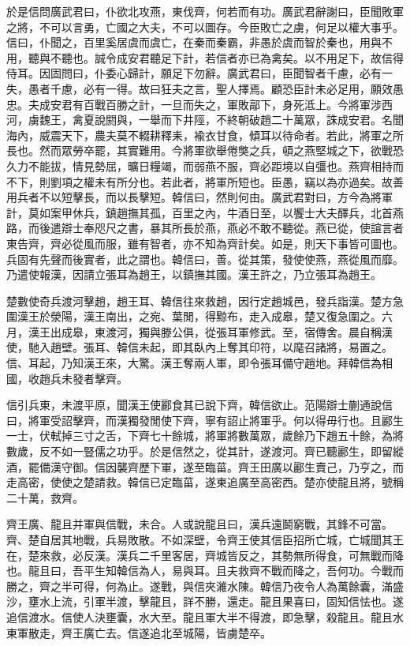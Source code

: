 於是信問廣武君曰，仆欲北攻燕，東伐齊，何若而有功。廣武君辭謝曰，臣聞敗軍之將，不可以言勇，亡國之大夫，不可以圖存。今臣敗亡之虜，何足以權大事乎。信曰，仆聞之，百里奚居虞而虞亡，在秦而秦霸，非愚於虞而智於秦也，用與不用，聽與不聽也。誠令成安君聽足下計，若信者亦已為禽矣。以不用足下，故信得侍耳。因固問曰，仆委心歸計，願足下勿辭。廣武君曰，臣聞智者千慮，必有一失，愚者千慮，必有一得。故曰狂夫之言，聖人擇焉。顧恐臣計未必足用，願效愚忠。夫成安君有百戰百勝之計，一旦而失之，軍敗鄗下，身死泜上。今將軍涉西河，虜魏王，禽夏說閼與，一舉而下井陘，不終朝破趙二十萬眾，誅成安君。名聞海內，威震天下，農夫莫不輟耕釋耒，褕衣甘食，傾耳以待命者。若此，將軍之所長也。然而眾勞卒罷，其實難用。今將軍欲舉倦獘之兵，頓之燕堅城之下，欲戰恐久力不能拔，情見勢屈，曠日糧竭，而弱燕不服，齊必距境以自彊也。燕齊相持而不下，則劉項之權未有所分也。若此者，將軍所短也。臣愚，竊以為亦過矣。故善用兵者不以短擊長，而以長擊短。韓信曰，然則何由。廣武君對曰，方今為將軍計，莫如案甲休兵，鎮趙撫其孤，百里之內，牛酒日至，以饗士大夫醳兵，北首燕路，而後遣辯士奉咫尺之書，暴其所長於燕，燕必不敢不聽從。燕已從，使諠言者東告齊，齊必從風而服，雖有智者，亦不知為齊計矣。如是，則天下事皆可圖也。兵固有先聲而後實者，此之謂也。韓信曰，善。從其策，發使使燕，燕從風而靡。乃遣使報漢，因請立張耳為趙王，以鎮撫其國。漢王許之，乃立張耳為趙王。

楚數使奇兵渡河擊趙，趙王耳、韓信往來救趙，因行定趙城邑，發兵詣漢。楚方急圍漢王於滎陽，漢王南出，之宛、葉閒，得黥布，走入成皋，楚又復急圍之。六月，漢王出成皋，東渡河，獨與滕公俱，從張耳軍修武。至，宿傳舍。晨自稱漢使，馳入趙壁。張耳、韓信未起，即其臥內上奪其印符，以麾召諸將，易置之。信、耳起，乃知漢王來，大驚。漢王奪兩人軍，即令張耳備守趙地。拜韓信為相國，收趙兵未發者擊齊。

信引兵東，未渡平原，聞漢王使酈食其已說下齊，韓信欲止。范陽辯士蒯通說信曰，將軍受詔擊齊，而漢獨發閒使下齊，寧有詔止將軍乎。何以得毋行也。且酈生一士，伏軾掉三寸之舌，下齊七十餘城，將軍將數萬眾，歲餘乃下趙五十餘，為將數歲，反不如一豎儒之功乎。於是信然之，從其計，遂渡河。齊已聽酈生，即留縱酒，罷備漢守御。信因襲齊歷下軍，遂至臨菑。齊王田廣以酈生賣己，乃亨之，而走高密，使使之楚請救。韓信已定臨菑，遂東追廣至高密西。楚亦使龍且將，號稱二十萬，救齊。

齊王廣、龍且并軍與信戰，未合。人或說龍且曰，漢兵遠鬬窮戰，其鋒不可當。齊、楚自居其地戰，兵易敗散。不如深壁，令齊王使其信臣招所亡城，亡城聞其王在，楚來救，必反漢。漢兵二千里客居，齊城皆反之，其勢無所得食，可無戰而降也。龍且曰，吾平生知韓信為人，易與耳。且夫救齊不戰而降之，吾何功。今戰而勝之，齊之半可得，何為止。遂戰，與信夾濰水陳。韓信乃夜令人為萬餘囊，滿盛沙，壅水上流，引軍半渡，擊龍且，詳不勝，還走。龍且果喜曰，固知信怯也。遂追信渡水。信使人決壅囊，水大至。龍且軍大半不得渡，即急擊，殺龍且。龍且水東軍散走，齊王廣亡去。信遂追北至城陽，皆虜楚卒。

